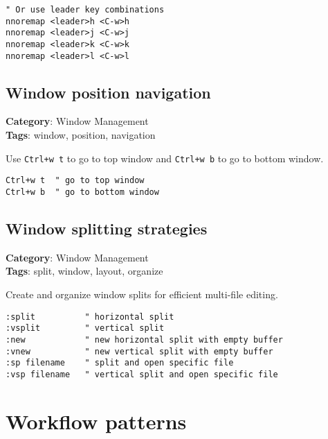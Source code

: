 {{{{{{{{{{{{{{{{{{{\begin{Exa*}{}
\begin{Verbatim}[fontsize=\footnotesize, breaklines, breakanywhere]
" Or use leader key combinations
nnoremap <leader>h <C-w>h
nnoremap <leader>j <C-w>j
nnoremap <leader>k <C-w>k
nnoremap <leader>l <C-w>l
\end{Verbatim}
\end{Exa*}

\section{Window position navigation}

\textbf{Category}: Window Management\\ \textbf{Tags}: window, position, navigation
\vspace{0.5cm}

Use {\footnotesize \Verb§Ctrl+w t§} to go to top window and {\footnotesize \Verb§Ctrl+w b§} to go to bottom window.

\begin{Exa*}{}
\begin{Verbatim}[fontsize=\footnotesize, breaklines, breakanywhere]
Ctrl+w t  " go to top window
Ctrl+w b  " go to bottom window
\end{Verbatim}
\end{Exa*}

\section{Window splitting strategies}

\textbf{Category}: Window Management\\ \textbf{Tags}: split, window, layout, organize
\vspace{0.5cm}

Create and organize window splits for efficient multi-file editing.

\begin{Exa*}{}
\begin{Verbatim}[fontsize=\footnotesize, breaklines, breakanywhere]
:split          " horizontal split
:vsplit         " vertical split
:new            " new horizontal split with empty buffer
:vnew           " new vertical split with empty buffer
:sp filename    " split and open specific file
:vsp filename   " vertical split and open specific file
\end{Verbatim}
\end{Exa*}

\chapter{Workflow patterns}
}}}}}}}}}}}}}}}}}}}
